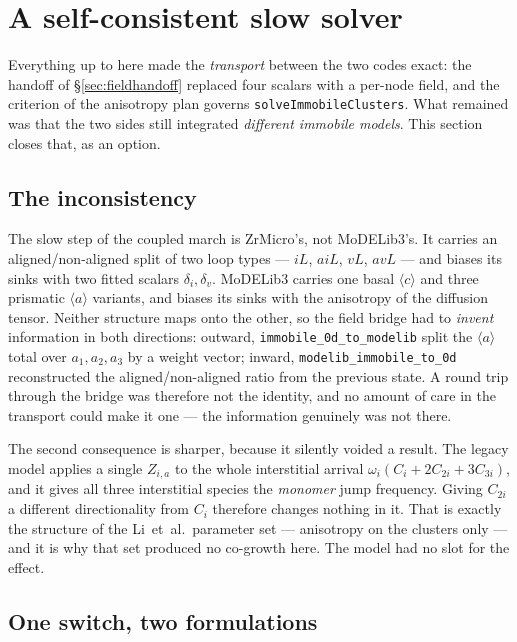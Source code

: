 \documentclass[11pt,a4paper]{article}
\newcommand{\code}[1]{\texttt{\small #1}}
\newcommand{\aloop}{\ensuremath{\langle a\rangle}}
\newcommand{\cloop}{\ensuremath{\langle c\rangle}}
\begin{document}
\section{A self-consistent slow solver}
\label{sec:selfconsistent}

Everything up to here made the \emph{transport} between the two codes exact: the
handoff of \S\ref{sec:fieldhandoff} replaced four scalars with a per-node field,
and the criterion of the anisotropy plan governs \code{solveImmobileClusters}.
What remained was that the two sides still integrated \emph{different immobile
models}. This section closes that, as an option.

\subsection{The inconsistency}

The slow step of the coupled march is ZrMicro's, not MoDELib3's. It carries an
aligned/non-aligned split of two loop types --- $iL$, $aiL$, $vL$, $avL$ --- and
biases its sinks with two fitted scalars $\delta_i, \delta_v$. MoDELib3 carries
one basal \cloop{} and three prismatic \aloop{} variants, and biases its sinks
with the anisotropy of the diffusion tensor. Neither structure maps onto the
other, so the field bridge had to \emph{invent} information in both directions:
outward, \code{immobile\_0d\_to\_modelib} split the \aloop{} total over
$a_1,a_2,a_3$ by a weight vector; inward,
\code{modelib\_immobile\_to\_0d} reconstructed the aligned/non-aligned ratio
from the previous state. A round trip through the bridge was therefore not the
identity, and no amount of care in the transport could make it one --- the
information genuinely was not there.

The second consequence is sharper, because it silently voided a result. The
legacy model applies a single $Z_{i,a}$ to the whole interstitial arrival
$\omega_i(C_i + 2C_{2i} + 3C_{3i})$, and it gives all three interstitial
species the \emph{monomer} jump frequency. Giving $C_{2i}$ a different
directionality from $C_i$ therefore changes nothing in it. That is exactly the
structure of the Li~et~al.\ parameter set --- anisotropy on the clusters only
--- and it is why that set produced no co-growth here. The model had no slot
for the effect.

\subsection{One switch, two formulations}
\end{document}
